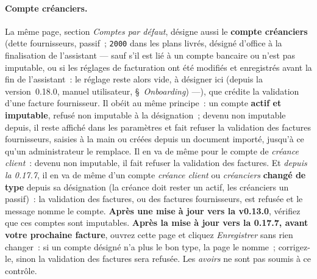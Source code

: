 \documentclass[a4paper,11pt,oneside]{article}
\begin{document}
\paragraph{Compte créanciers.} La même page, section \emph{Comptes par défaut}, désigne aussi le \textbf{compte créanciers} (dette fournisseurs, passif~; \texttt{2000} dans les plans livrés, désigné d'office à la finalisation de l'assistant --- sauf s'il est lié à un compte bancaire ou n'est pas imputable, ou si les réglages de facturation ont été modifiés et enregistrés avant la fin de l'assistant~: le réglage reste alors vide, à désigner ici (depuis la version~0.18.0, manuel utilisateur, \S~\emph{Onboarding}) ---), que crédite la validation d'une facture fournisseur. Il obéit au même principe~: un compte \textbf{actif et imputable}, refusé non imputable à la désignation~; devenu non imputable depuis, il reste affiché dans les paramètres et fait refuser la validation des factures fournisseurs, saisies à la main ou créées depuis un document importé, jusqu'à ce qu'un administrateur le remplace. Il en va de même pour le compte de \emph{créance client}~: devenu non imputable, il fait refuser la validation des factures. Et \emph{depuis la 0.17.7}, il en va de même d'un compte \emph{créance client} ou \emph{créanciers} \textbf{changé de type} depuis sa désignation (la créance doit rester un actif, les créanciers un passif)~: la validation des factures, ou des factures fournisseurs, est refusée et le message nomme le compte. \textbf{Après une mise à jour vers la v0.13.0}, vérifiez que ces comptes sont imputables. \textbf{Après la mise à jour vers la 0.17.7, avant votre prochaine facture}, ouvrez cette page et cliquez \emph{Enregistrer} sans rien changer~: si un compte désigné n'a plus le bon type, la page le nomme~; corrigez-le, sinon la validation des factures sera refusée. Les \emph{avoirs} ne sont pas soumis à ce contrôle.
\end{document}
